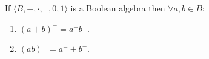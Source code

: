 If $\langle B, +, \cdot, ^-, 0, 1 \rangle$ is a Boolean algebra then $\forall a, b \in B$:
\begin{enumerate}
\item $(a + b)^- = a^- b^-$.
\item $(ab)^- = a^- + b^-$.
\end{enumerate}
